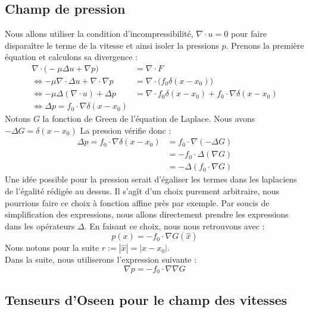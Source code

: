 \subsection{Champ de pression}

Nous allons utiliser la condition d'incompressibilité, $\nabla \cdot u = 0$ pour faire disparaître le terme de la vitesse et ainsi isoler la pressions $p$.
Prenons la première équation et calculons sa divergence :
\begin{align*}
    \nabla \cdot \Big(-\mu \Delta u + \nabla p \Big) &= \nabla \cdot F \\
    \Leftrightarrow -\mu \nabla \cdot \Delta u + \nabla \cdot \nabla p &= \nabla \cdot \big(f_0 \delta(x - x_0) \big) \\
    \Leftrightarrow -\mu \Delta (\nabla \cdot u) + \Delta p &= \nabla \cdot f_0 \delta(x-x_0) + f_0 \cdot \nabla \delta(x-x_0) \\
    \Leftrightarrow \Delta p = f_0 \cdot \nabla \delta(x-x_0)
\end{align*}
Notons $G$ la fonction de Green de l'équation de Laplace. Nous avons $-\Delta G = \delta(x-x_0)$
La pression vérifie donc :
\begin{align*}
    \Delta p = f_0 \cdot \nabla \delta (x-x_0) &= f_0 \cdot \nabla (- \Delta G) \\
    &= -f_0 \cdot \Delta (\nabla G) \\
    &= -\Delta (f_0 \cdot \nabla G)
\end{align*}
Une idée possible pour la pression serait d'égaliser les termes dans les laplaciens de l'égalité rédigée au dessus. Il s'agît d'un choix 
purement arbitraire, nous pourrions faire ce choix à fonction affine près par exemple. Par soucis de simplification des expressions,
nous allons directement prendre les expressions dans les opérateurs $\Delta$.
En faisant ce choix, nous nous retrouvons avec :
$$ p(x) = -f_0 \cdot \nabla G(\hat{x}) $$
Nous notons pour la suite $r := |\hat{x}| = |x - x_0|$.\\
Dans la suite, nous utiliserons l'expression suivante :
$$ \nabla p = -f_0 \cdot \nabla \nabla G $$



\subsection{Tenseurs d'Oseen pour le champ des vitesses}

